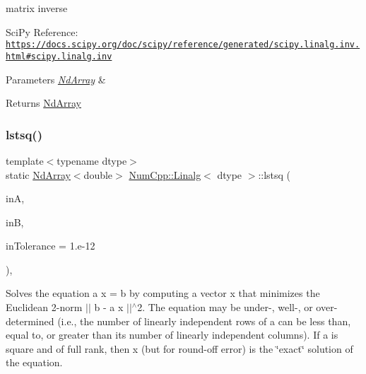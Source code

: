matrix inverse

Sci\+Py Reference\+: \href{https://docs.scipy.org/doc/scipy/reference/generated/scipy.linalg.inv.html#scipy.linalg.inv}{\tt https\+://docs.\+scipy.\+org/doc/scipy/reference/generated/scipy.\+linalg.\+inv.\+html\#scipy.\+linalg.\+inv}


\begin{DoxyParams}{Parameters}
{\em \mbox{\hyperlink{class_num_cpp_1_1_nd_array}{Nd\+Array}}} & \\
\hline
\end{DoxyParams}
\begin{DoxyReturn}{Returns}
\mbox{\hyperlink{class_num_cpp_1_1_nd_array}{Nd\+Array}} 
\end{DoxyReturn}
\mbox{\label{class_num_cpp_1_1_linalg_a92127eb11ad68e68d69b147bce317ffe}} 
\subsubsection{\texorpdfstring{lstsq()}{lstsq()}}
{\footnotesize\ttfamily template$<$typename dtype$>$ \\
static \mbox{\hyperlink{class_num_cpp_1_1_nd_array}{Nd\+Array}}$<$double$>$ \mbox{\hyperlink{class_num_cpp_1_1_linalg}{Num\+Cpp\+::\+Linalg}}$<$ dtype $>$\+::lstsq (\begin{DoxyParamCaption}\item[{const \mbox{\hyperlink{class_num_cpp_1_1_nd_array}{Nd\+Array}}$<$ dtype $>$ \&}]{inA,  }\item[{const \mbox{\hyperlink{class_num_cpp_1_1_nd_array}{Nd\+Array}}$<$ dtype $>$ \&}]{inB,  }\item[{double}]{in\+Tolerance = {\ttfamily 1.e-\/12} }\end{DoxyParamCaption})\hspace{0.3cm}{\ttfamily [inline]}, {\ttfamily [static]}}

Solves the equation a x = b by computing a vector x that minimizes the Euclidean 2-\/norm $\vert$$\vert$ b -\/ a x $\vert$$\vert$$^\wedge$2. The equation may be under-\/, well-\/, or over-\/ determined (i.\+e., the number of linearly independent rows of a can be less than, equal to, or greater than its number of linearly independent columns). If a is square and of full rank, then x (but for round-\/off error) is the \char`\"{}exact\char`\"{} solution of the equation.

